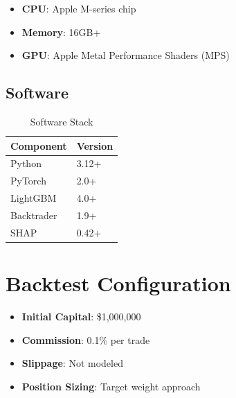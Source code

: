 \begin{itemize}
    \item \textbf{CPU}: Apple M-series chip
    \item \textbf{Memory}: 16GB+
    \item \textbf{GPU}: Apple Metal Performance Shaders (MPS)
\end{itemize}

\subsection{Software}

\begin{table}[h]
\centering
\caption{Software Stack}
\begin{tabular}{ll}
\toprule
Component & Version \\
\midrule
Python & 3.12+ \\
PyTorch & 2.0+ \\
LightGBM & 4.0+ \\
Backtrader & 1.9+ \\
SHAP & 0.42+ \\
\bottomrule
\end{tabular}
\end{table}

\section{Backtest Configuration}

\begin{itemize}
    \item \textbf{Initial Capital}: \$1,000,000
    \item \textbf{Commission}: 0.1\% per trade
    \item \textbf{Slippage}: Not modeled
    \item \textbf{Position Sizing}: Target weight approach
\end{itemize}